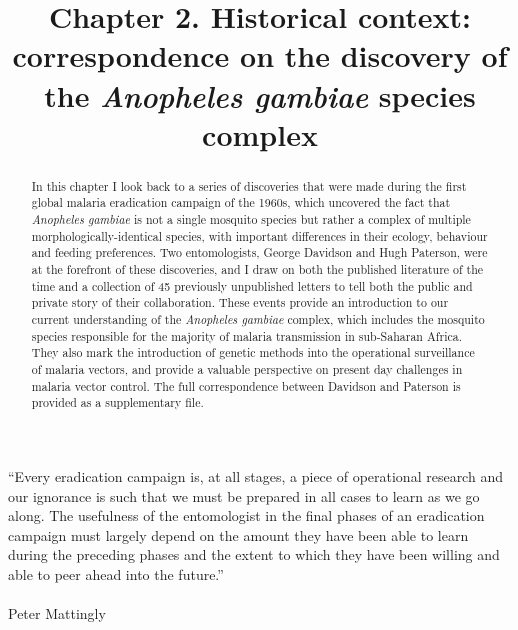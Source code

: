 \documentclass[a4paper,11pt,abstracton,hidelinks]{scrartcl}
\title{
Chapter 2. Historical context: correspondence on the discovery of the \textit{Anopheles gambiae} species complex
}
\author{}
\begin{document}
\renewcommand{\abstractname}{Summary}


\maketitle


\begin{displayquote}
``Every eradication campaign is, at all stages, a piece of operational research and our ignorance is such that we must be prepared in all cases to learn as we go along. The usefulness of the entomologist in the final phases of an eradication campaign must largely depend on the amount they have been able to learn during the preceding phases and the extent to which they have been willing and able to peer ahead into the future.'' \\\\ Peter Mattingly \citeyearpar{Mattingly1963}
\end{displayquote}



\begin{abstract}


In this chapter I look back to a series of discoveries that were made during the first global malaria eradication campaign of the 1960s, which uncovered the fact that \textit{Anopheles gambiae} is not a single mosquito species but rather a complex of multiple morphologically-identical species, with important differences in their ecology, behaviour and feeding preferences. 
%
Two entomologists, George Davidson and Hugh Paterson, were at the forefront of these discoveries, and I draw on both the published literature of the time and a collection of 45 previously unpublished letters to tell both the public and private story of their collaboration.
%
These events provide an introduction to our current understanding of the \textit{Anopheles gambiae} complex, which includes the mosquito species responsible for the majority of malaria transmission in sub-Saharan Africa.
%
They also mark the introduction of genetic methods into the operational surveillance of malaria vectors, and provide a valuable perspective on present day challenges in malaria vector control.
%
The full correspondence between Davidson and Paterson is provided as a supplementary file.


\end{abstract}
\end{document}
